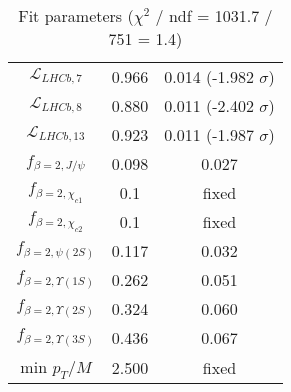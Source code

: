 \begin{table}[h!]
\begin{tabular}{c|c|c}
$\mathcal L_{LHCb,7}$ & 0.966 & 0.014 (-1.982 $\sigma$) \\
$\mathcal L_{LHCb,8}$ & 0.880 & 0.011 (-2.402 $\sigma$) \\
$\mathcal L_{LHCb,13}$ & 0.923 & 0.011 (-1.987 $\sigma$) \\
$f_{\beta=2,J/\psi}$ & 0.098 & 0.027 \\
$f_{\beta=2,\chi_{c1}}$ & 0.1 & fixed \\
$f_{\beta=2,\chi_{c2}}$ & 0.1 & fixed \\
$f_{\beta=2,\psi(2S)}$ & 0.117 & 0.032 \\
$f_{\beta=2,\Upsilon(1S)}$ & 0.262 & 0.051 \\
$f_{\beta=2,\Upsilon(2S)}$ & 0.324 & 0.060 \\
$f_{\beta=2,\Upsilon(3S)}$ & 0.436 & 0.067 \\
min $p_T/M$ & 2.500 & fixed \\
\end{tabular}
\caption{Fit parameters ($\chi^2$ / ndf = 1031.7 / 751 = 1.4)}
\end{table}
